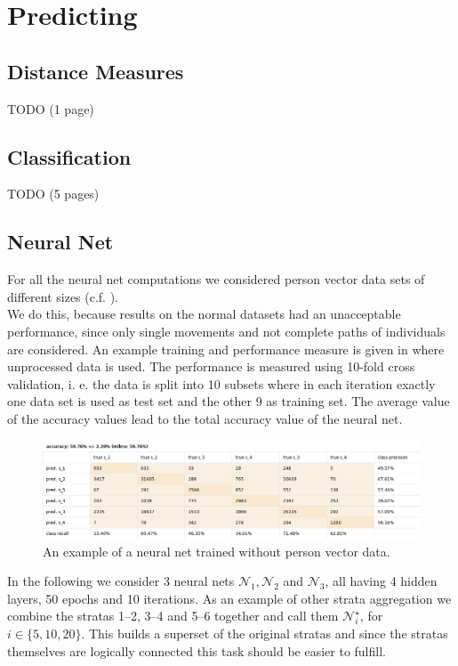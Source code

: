 \documentclass[runningheads]{llncs}
\begin{document}
	\section{Predicting}
	
	\subsection{Distance Measures} \label{subsec: distance measures}
	TODO (1 page)
	
	\subsection{Classification} \label{subsec: classification}
	TODO (5 pages)	
	\subsection{Neural Net} \label{subsec: neural net}
	For all the neural net computations we considered person vector data sets of different sizes (c.f. ).\\
	
	We do this, because results on the normal datasets had an unacceptable performance, since only single movements and not complete paths of individuals are considered. An example training and performance measure is given in  where unprocessed data is used. The performance is measured using 10-fold cross validation, i. e. the data is split into 10 subsets where in each iteration exactly one data set is used as test set and the other 9 as training set. The average value of the accuracy values lead
	to the total accuracy value of the neural net.
	\begin{figure}[H]
		\centering
		\includegraphics[scale = 0.4]{src/pic/NN_without_vector.png}
		\caption{An example of a neural net trained without person vector data.}
		\label{fig: NN without vector}
	\end{figure}
	
	In the following we consider 3 neural nets $\mathcal{N}_1,\mathcal{N}_2$ and $\mathcal{N}_3$, all having 4 hidden layers, 50 epochs and 10 iterations.	
	As an example of other strata aggregation we combine the stratas 1--2, 3--4 and 5--6 together and call them $\mathcal{N}_i^\star$, for $i \in \{5,10,20\}$. This builds a superset of the original stratas and since the stratas themselves are logically connected this task should be easier to fulfill.\\
	
\end{document}
